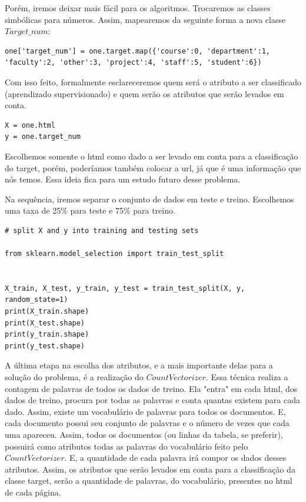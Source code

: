 \documentclass [12pt, a4paper] {article}
\begin{document}
Porém, iremos deixar mais fácil para os algoritmos. Trocaremos as classes simbólicas para números. Assim, mapearemos da seguinte forma a nova classe $Target\_num$:

\begin{lstlisting}
one['target_num'] = one.target.map({'course':0, 'department':1, 'faculty':2, 'other':3, 'project':4, 'staff':5, 'student':6})
\end{lstlisting}


Com isso feito, formalmente esclareceremos quem será o atributo a ser classificado (aprendizado supervisionado) e quem serão os atributos que serão levados em conta.

\begin{lstlisting}
X = one.html
y = one.target_num
\end{lstlisting}

Escolhemos somente o html como dado a ser levado em conta para a classificação do target, porém, poderíamos também colocar a url, já que é uma informação que nós temos. Essa ideia fica para um estudo futuro desse problema.


Na sequência, iremos separar o conjunto de dados em teste e treino. Escolhemos uma taxa de 25\% para teste e 75\% para treino. 

\begin{lstlisting}
# split X and y into training and testing sets

from sklearn.model_selection import train_test_split


X_train, X_test, y_train, y_test = train_test_split(X, y, random_state=1)
print(X_train.shape)
print(X_test.shape)
print(y_train.shape)
print(y_test.shape)
\end{lstlisting}

A última etapa na escolha dos atributos, e a mais importante delas para a solução do problema, é a realização do $CountVectorizer$. Essa técnica realiza a contagem de palavras de todos os dados de treino. Ela "entra" em cada html, dos dados de treino, procura por todas as palavras e conta quantas existem para cada dado. Assim, existe um vocabulário de palavras para todos os documentos. E, cada documento possui seu conjunto de palavras e o número de vezes que cada uma apareceu. Assim, todos os documentos (ou linhas da tabela, se preferir), possuirá como atributos todas as palavras do vocabulário feito pelo $CountVectorizer$. E, a quantidade de cada palavra irá compor os dados desses atributos. 
Assim, os atributos que serão levados em conta para a classificação da classe target, serão a quantidade de palavras, do vocabulário, presentes no html de cada página.
\end{document}
